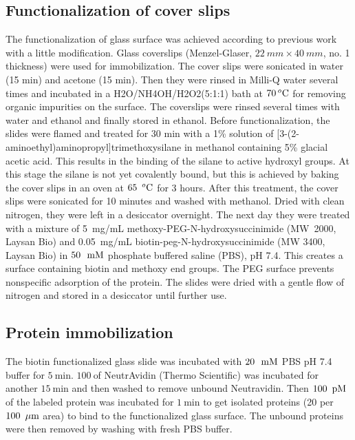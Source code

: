 \subsection{Functionalization of cover slips}
The functionalization of glass surface was achieved according to previous work with a little modification.\cite{gupta2012involvement} Glass coverslips (Menzel-Glaser, $22~mm \times 40~mm$, no. 1 thickness) were used for immobilization. The cover slips were sonicated in water (15 min) and acetone (15 min). Then they were rinsed in Milli-Q water several times and incubated in a H2O/NH4OH/H2O2(5:1:1) bath at $70\,^o\textrm{C}$ for removing organic impurities on the surface. The coverslips were rinsed several times with water and ethanol and finally stored in ethanol. Before functionalization, the slides were flamed and treated for 30 min with a 1\% solution of [3-(2-aminoethyl)aminopropyl]trimethoxysilane in methanol containing 5\% glacial acetic acid. This results in the binding of the silane to active hydroxyl groups. At this stage the silane is not yet covalently bound, but this is achieved by baking the cover slips in an oven at $65~\,^o\textrm{C}$ for 3 hours. After this treatment, the cover slips were sonicated for 10 minutes and washed with methanol. Dried with clean nitrogen, they were left in a desiccator overnight. The next day they were treated with a mixture of 5~mg/mL methoxy-PEG-N-hydroxysuccinimide (MW~2000, Laysan Bio) and 0.05~mg/mL
biotin-peg-N-hydroxysuccinimide (MW 3400, Laysan Bio) in $50~\,\,\textrm{m}\textrm{M}$ phosphate buffered saline (PBS), pH 7.4. This creates a surface containing biotin and methoxy end groups. The PEG surface prevents nonspecific adsorption of the protein. The slides were dried with a gentle flow of nitrogen and stored in a desiccator until further use.
\subsection{Protein immobilization}
The biotin functionalized glass slide was incubated with $20~\,\,\textrm{m}\textrm{M}$ PBS pH 7.4 buffer for $5~$min. $100~$\nM of NeutrAvidin (Thermo Scientific) was incubated for another $15~$min and then washed to remove unbound Neutravidin. Then $100~\,\textrm{pM}$ of the labeled protein was incubated for $1~$min to get isolated proteins (20 per $100~\,\mu\textrm{m}$ area) to bind to the functionalized glass surface. The unbound proteins were then removed by washing with fresh PBS buffer.
